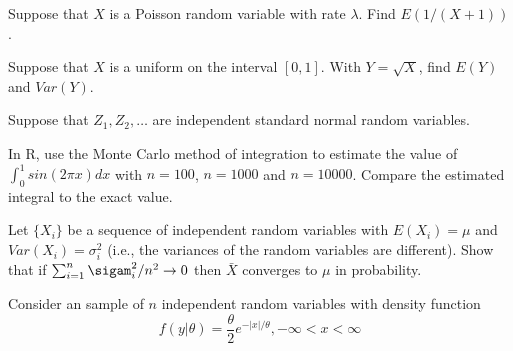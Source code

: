 \documentclass[addpoints]{examsetup}\usepackage[]{graphicx}\usepackage[]{color}
\begin{document}



\examCoverPage

\begin{questions}
\question[5] 
Suppose that $X$ is a Poisson random variable with rate $\lambda$. Find $E(1/(X + 1))$.

\question[5] 
Suppose that $X$ is a uniform on the interval $[0, 1]$. With $Y = \sqrt{X}$, find $E(Y)$ and $Var(Y)$.

\question
Suppose that $Z_1, Z_2, \ldots$ are independent standard normal random variables. 

\question[10] 
In R, use the Monte Carlo method of integration to estimate the value of $\int_{0}^1 sin(2 \pi x) dx$ with $n = 100$, $n = 1000$ and $n = 10000$. Compare the estimated integral to the exact value.

\question[5] 
Let $\{X_i\}$ be a sequence of independent random variables with $E(X_i) = \mu$ and $Var(X_i) = \sigma_i^2$ (i.e., the variances of the random variables are different). Show that if $\sum_{i=1}^n \sigam_i^2/n^2 \rightarrow 0$ then $\bar{X}$ converges to $\mu$ in probability.

\question
Consider an sample of $n$ independent random variables with density function
\[
   f(y | \theta) = \frac{\theta}{2} e^{- |x|/\theta }, -\infty < x < \infty
\]


\end{questions}
\end{document}
